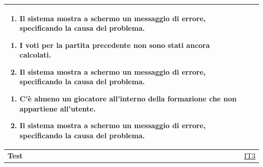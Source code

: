 \begin{table}[H]
\begin{tabularx}{\textwidth}{|l|X|}
\begin{enumerate}[leftmargin=*,label=3.\arabic*]
    \item Il sistema mostra a schermo un messaggio di errore, specificando la causa del problema.
\end{enumerate} 
\begin{enumerate}[leftmargin=*,label=4.\arabic*]
    \item I voti per la partita precedente non sono stati ancora calcolati.
    \item Il sistema mostra a schermo un messaggio di errore, specificando la causa del problema.
\end{enumerate}
\begin{enumerate}[leftmargin=*,label=5.\arabic*]
    \item C'è almeno un giocatore all'interno della formazione che non appartiene all'utente.
    \item Il sistema mostra a schermo un messaggio di errore, specificando la causa del problema.
\end{enumerate} \\
\hline
\textbf{Test} & \hyperref[IT3]{IT3} \\
\hline
\end{tabularx}

\end{table}



